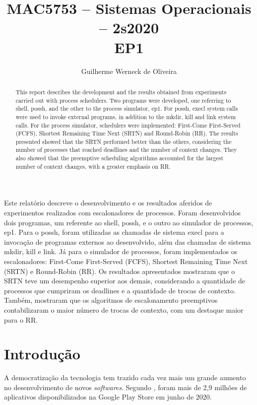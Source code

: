 \documentclass[12pt]{article}
\title{MAC5753 -- Sistemas Operacionais -- 2s2020\\ EP1}
\author{Guilherme Werneck de Oliveira\inst{1}}
\begin{document}
\maketitle

\begin{abstract}
  This report describes the development and the results obtained from experiments carried out with process schedulers. Two programs were developed, one referring to shell, possh, and the other to the process simulator, ep1. For possh, execl system calls were used to invoke external programs, in addition to the mkdir, kill and link system calls.
  For the process simulator, schedulers were implemented: First-Come First-Served (FCFS), Shortest Remaining Time Next (SRTN) and Round-Robin (RR). The results presented showed that the SRTN performed better than the others, considering the number of processes that reached deadlines and the number of context changes. They also showed that the preemptive scheduling algorithms accounted for the largest number of context changes, with a greater emphasis on RR.
\end{abstract}

\begin{resumo}
  Este relatório descreve o desenvolvimento e os resultados aferidos de experimentos realizados com escalonadores de processos. Foram desenvolvidos dois programas, um referente ao shell, possh, e o outro ao simulador de processos, ep1. Para o possh, foram utilizadas as chamadas de sistema execl para a invocação de programas externos ao desenvolvido, além das chamadas de sistema mkdir, kill e link.
  Já para o simulador de processos, foram implementados os escalonadores: First-Come First-Served (FCFS), Shortest Remaining Time Next (SRTN) e Round-Robin (RR). Os resultados apresentados mostraram que o SRTN teve um desempenho superior aos demais, considerando a quantidade de processos que cumpriram os deadlines e a quantidade de trocas de contexto. Também, mostraram que os algoritmos de escalonamento preemptivos contabilizaram o maior número de trocas de contexto, com um destaque maior para o RR.
\end{resumo}


\section{Introdução}

A democratização da tecnologia tem trazido cada vez mais um grande aumento no desenvolvimento de novos \textit{softwares}. Segundo \cite{clement:20}, foram mais de 2,9 milhões de aplicativos disponibilizados na Google Play Store em junho de 2020.
\end{document}
